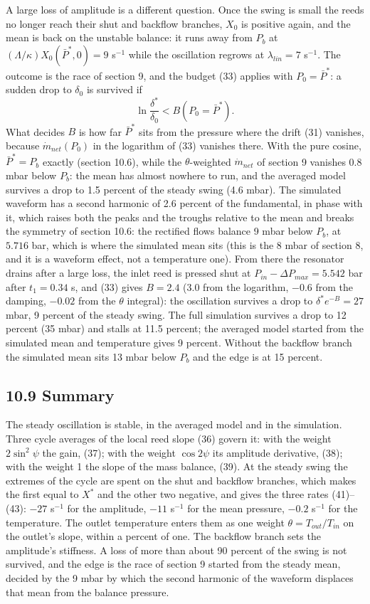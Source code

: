 \documentclass[11pt]{article}
\begin{document}
A large loss of amplitude is a different question. Once the swing is small the reeds no longer reach their shut and backflow branches, $X_0$ is positive again, and the mean is back on the unstable balance: it runs away from $P_b$ at $(\Lambda/\kappa)X_0(\bar P^*, 0) = 9$ s$^{-1}$ while the oscillation regrows at $\lambda_{lin} = 7$ s$^{-1}$. The outcome is the race of section 9, and the budget (33) applies with $P_0 = \bar P^*$: a sudden drop to $\delta_0$ is survived if
\begin{equation}
\ln\frac{\delta^*}{\delta_0} < B(P_0 = \bar P^*) . \tag{44}
\end{equation}
What decides $B$ is how far $\bar P^*$ sits from the pressure where the drift (31) vanishes, because $\dot m_{net}(P_0)$ in the logarithm of (33) vanishes there. With the pure cosine, $\bar P^* = P_b$ exactly (section 10.6), while the $\theta$-weighted $\dot m_{net}$ of section 9 vanishes 0.8 mbar below $P_b$: the mean has almost nowhere to run, and the averaged model survives a drop to 1.5 percent of the steady swing (4.6 mbar). The simulated waveform has a second harmonic of 2.6 percent of the fundamental, in phase with it, which raises both the peaks and the troughs relative to the mean and breaks the symmetry of section 10.6: the rectified flows balance 9 mbar below $P_b$, at $5.716$ bar, which is where the simulated mean sits (this is the 8 mbar of section 8, and it is a waveform effect, not a temperature one). From there the resonator drains after a large loss, the inlet reed is pressed shut at $P_{in} - \Delta P_{max} = 5.542$ bar after $t_1 = 0.34$ s, and (33) gives $B = 2.4$ (3.0 from the logarithm, $-0.6$ from the damping, $-0.02$ from the $\theta$ integral): the oscillation survives a drop to $\delta^*e^{-B} = 27$ mbar, 9 percent of the steady swing. The full simulation survives a drop to 12 percent (35 mbar) and stalls at 11.5 percent; the averaged model started from the simulated mean and temperature gives 9 percent. Without the backflow branch the simulated mean sits 13 mbar below $P_b$ and the edge is at 15 percent.

\subsection*{10.9 Summary}

The steady oscillation is stable, in the averaged model and in the simulation. Three cycle averages of the local reed slope (36) govern it: with the weight $2\sin^2\psi$ the gain, (37); with the weight $\cos 2\psi$ its amplitude derivative, (38); with the weight 1 the slope of the mass balance, (39). At the steady swing the extremes of the cycle are spent on the shut and backflow branches, which makes the first equal to $X^*$ and the other two negative, and gives the three rates (41)--(43): $-27$ s$^{-1}$ for the amplitude, $-11$ s$^{-1}$ for the mean pressure, $-0.2$ s$^{-1}$ for the temperature. The outlet temperature enters them as one weight $\theta = T_{out}/T_{in}$ on the outlet's slope, within a percent of one. The backflow branch sets the amplitude's stiffness. A loss of more than about 90 percent of the swing is not survived, and the edge is the race of section 9 started from the steady mean, decided by the 9 mbar by which the second harmonic of the waveform displaces that mean from the balance pressure.
\end{document}
